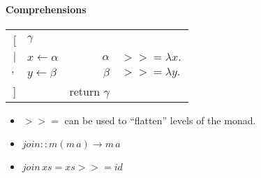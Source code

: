 \documentclass[times, 10pt,twocolumn,preprint]{article}
\theoremstyle{definition}
\newcommand{\LAMBDA}[2]{{\lambda #1.\,#2}}
\newcommand{\bind}{\mathbin{>\!\!>\!\!=}}
\newcommand{\para}[1]{
  \vspace{0.8cm}
  \paragraph{#1}}
\begin{document}
\para{Comprehensions}
\begin{tabular}{rl@{\qquad\qquad}|@{\qquad\qquad}rl}
[       & $γ$  &  & \\
$|$     & $x \leftarrow α$      & $ α$ & $\bind{} \LAMBDA x {} $\\
$,$     & $y \leftarrow β$      & $ β$ & $\bind{} \LAMBDA y {} $\\
]       &  &  return $γ$ & \\
\end{tabular}


\begin{itemize}
\item $\bind{}$ can be used to ``flatten'' levels of the monad.
\item $join :: m (m\, a)  \to m\, a$
\item $join \, xs = xs \bind{} id$
\end{itemize}
\end{document}
